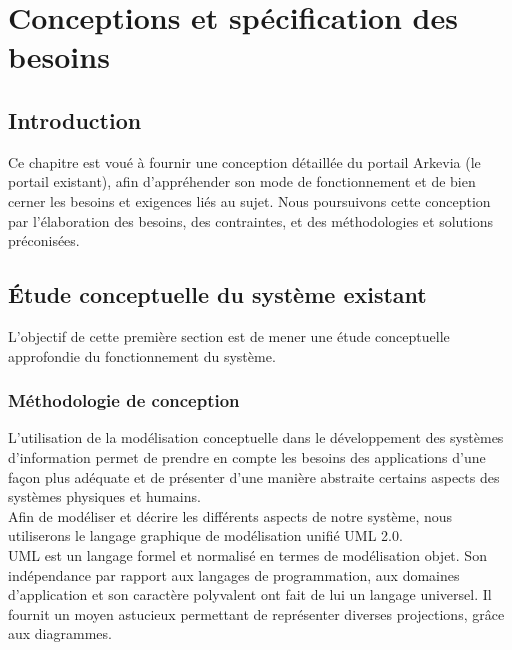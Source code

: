 \section{Conceptions et spécification des besoins}
\subsection*{Introduction}
Ce chapitre est voué à fournir une conception détaillée du portail Arkevia (le portail existant), afin d'appréhender son mode de fonctionnement et de bien cerner les besoins et exigences liés au sujet. Nous poursuivons cette conception par l'élaboration des besoins, des contraintes, et des méthodologies et solutions préconisées.
\subsection{Étude conceptuelle du système existant}
L'objectif de cette première section est de mener une étude conceptuelle approfondie du fonctionnement du système.
\subsubsection{Méthodologie de conception}
L’utilisation de la modélisation conceptuelle dans le développement des systèmes d’information permet de prendre en compte les besoins des applications d’une façon plus adéquate et de présenter d’une manière abstraite certains aspects des systèmes physiques et humains.\\

Afin de modéliser et décrire les différents aspects de notre système, nous utiliserons le langage graphique de modélisation unifié UML 2.0.\\
UML est un langage formel et normalisé en termes de modélisation objet. Son indépendance par rapport aux langages de programmation, aux domaines d’application et son caractère polyvalent ont fait de lui un langage universel. Il fournit un moyen astucieux permettant de représenter diverses projections, grâce aux diagrammes.\\

